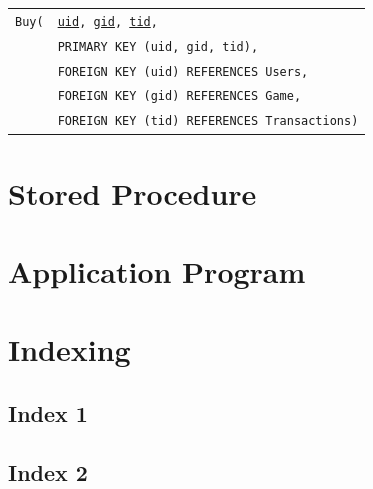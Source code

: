 \documentclass[12pt, oneside]{article}
\begin{document}
\begin{tabular}{l@{}l}
    \texttt{Buy(} & \texttt{\underline{uid}, \underline{gid}, \underline{tid},}\\
                   & \texttt{PRIMARY KEY (uid, gid, tid),}\\
                   & \texttt{FOREIGN KEY (uid) REFERENCES Users,}\\
                   & \texttt{FOREIGN KEY (gid) REFERENCES Game,}\\
                   & \texttt{FOREIGN KEY (tid) REFERENCES Transactions)}
\end{tabular}

\section{Stored Procedure}


\section{Application Program}

\section{Indexing}
\subsection{Index 1}

\subsection{Index 2}
\end{document}
